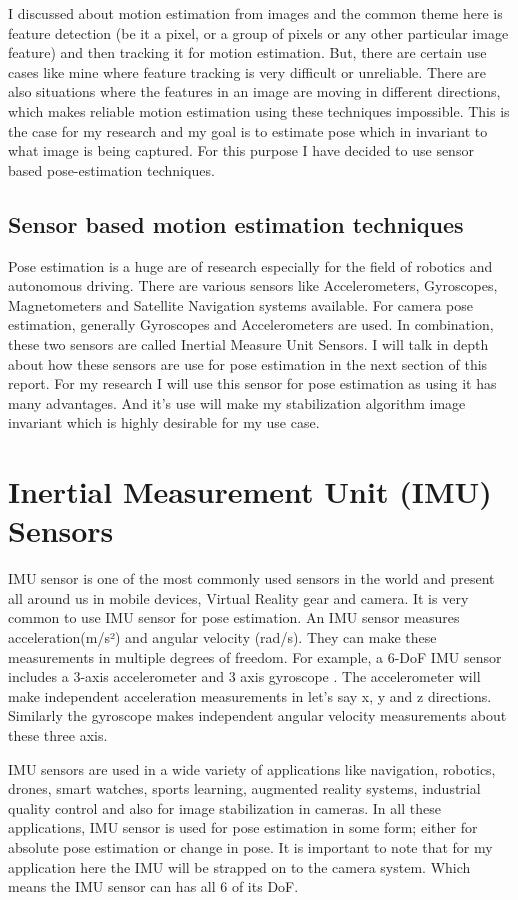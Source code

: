 I discussed about motion estimation from images and the common theme here is feature detection (be it a pixel, or a group of pixels or any other particular image feature) and then tracking it for motion estimation. But, there are certain use cases like mine where feature tracking is very difficult or unreliable. There are also situations where the features in an image are moving in different directions, which makes reliable motion estimation using these techniques impossible. This is the case for my research and my goal is to estimate pose which in invariant to what image is being captured. For this purpose I have decided to use sensor based pose-estimation techniques.

\subsection{Sensor based motion estimation techniques}
Pose estimation is a huge are of research especially for the field of robotics and autonomous driving. There are various sensors like Accelerometers, Gyroscopes, Magnetometers and Satellite Navigation systems available. For camera pose estimation, generally Gyroscopes and Accelerometers are used. In combination, these two sensors are called Inertial Measure Unit Sensors. I will talk in depth about how these sensors are use for pose estimation in the next section of this report. For my research I will use this sensor for pose estimation as using it has many advantages. And it's use will make my stabilization algorithm image invariant which is highly desirable for my use case.

\section{Inertial Measurement Unit (IMU) Sensors}
\label{sec:imu}
IMU sensor is one of the most commonly used sensors in the world and present all around us in mobile devices, Virtual Reality gear and camera. It is very common to use IMU sensor for pose estimation. An IMU sensor measures acceleration(m/s²) and angular velocity (rad/s).  They can make these measurements in multiple degrees of freedom. For example, a 6-DoF IMU sensor includes a 3-axis accelerometer and 3 axis gyroscope  \citep{constant2021data}. The accelerometer will make independent acceleration measurements in let's say x, y and z directions. Similarly the gyroscope makes independent angular velocity measurements about these three axis.

IMU sensors are used in a wide variety of applications like navigation, robotics, drones, smart watches, sports learning, augmented reality systems, industrial quality control \citep{ahmad2013reviews}  and also for image stabilization in cameras. In all these applications, IMU sensor is used for pose estimation in some form; either for absolute pose estimation or change in pose. It is important to note that for my application here the IMU will be strapped on to the camera system. Which means the IMU sensor can has all 6 of its DoF.

